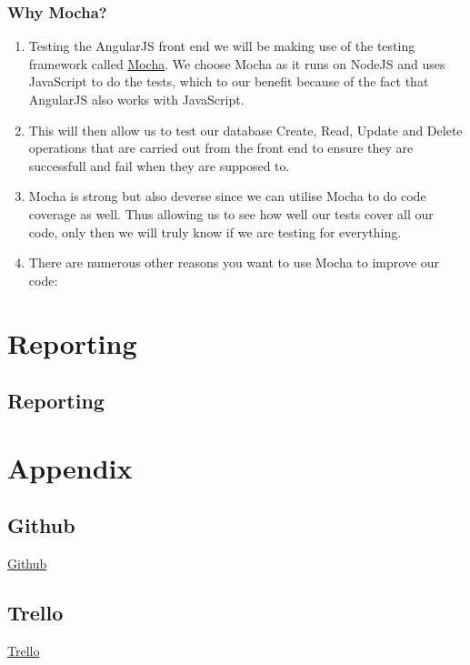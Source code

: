 \documentclass{article}
\begin{document}
		\subsubsection{Why Mocha?}
			\begin{enumerate}
				\item Testing the AngularJS front end we will be making use of the testing framework called \href{http://mochajs.org/}{Mocha}. We choose Mocha as it runs on NodeJS and uses JavaScript to do the tests, which to our benefit because of the fact that AngularJS also works with JavaScript.
				\item This will then allow us to test our database Create, Read, Update and Delete operations that are carried out from the front end to ensure they are successfull and fail when they are supposed to.
				\item Mocha is strong but also deverse since we can utilise Mocha to do code coverage as well. Thus allowing us to see how well our tests cover all our code, only then we will truly know if we are testing for everything.
				\item There are numerous other reasons you want to use Mocha to improve our code:
			\end{enumerate}
           			
\section{Reporting}
   	\subsection{Reporting}
  
\section{Appendix}
	\subsection{Github}
		\href{https://github.com/KobusMarais/Cerebero}{Github}
	\subsection{Trello}
		\href{https://trello.com/b/WXh8cJZQ/demo-2}{Trello}
\end{document}
